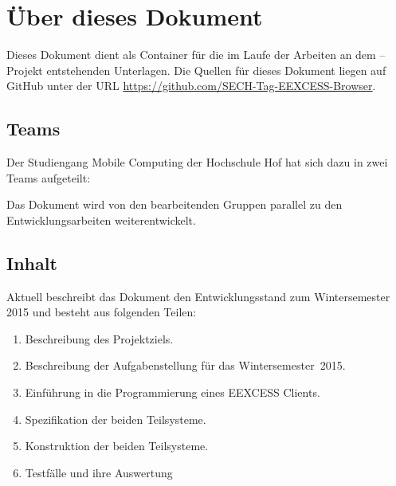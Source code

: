 \chapter{Über dieses Dokument}

Dieses Dokument dient als Container für die im Laufe der
Arbeiten an dem \SECH--Projekt entstehenden Unterlagen. Die
Quellen für dieses Dokument liegen auf GitHub unter der URL
\url{https://github.com/SECH-Tag-EEXCESS-Browser}.

\section{Teams}
Der Studiengang Mobile Computing der Hochschule Hof hat sich dazu in zwei Teams aufgeteilt:




Das Dokument wird von den bearbeitenden Gruppen parallel zu den
Entwicklungsarbeiten weiterentwickelt. \\

\section{Inhalt}
Aktuell beschreibt das Dokument den Entwicklungsstand zum
Wintersemester 2015 und besteht aus folgenden Teilen:
\begin{enumerate}
     \item Beschreibung des Projektziels.
     \item Beschreibung der Aufgabenstellung für das Wintersemester~2015.
     \item Einführung in die Programmierung eines EEXCESS Clients.
     \item Spezifikation der beiden Teilsysteme.
     \item Konstruktion der beiden Teilsysteme.
     \item Testfälle und ihre Auswertung
\end{enumerate}

